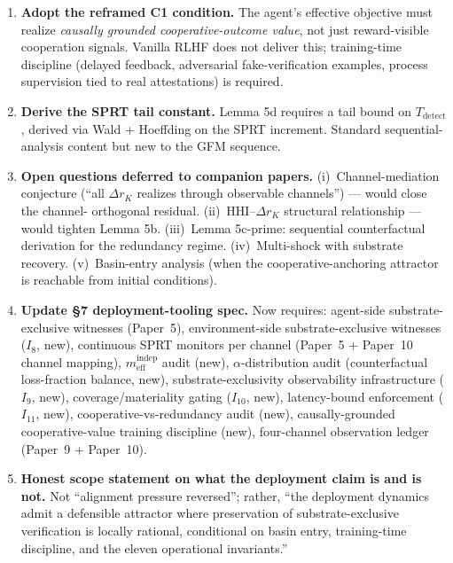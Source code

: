 \documentclass{article}
\newcommand{\meff}{m_{\mathrm{eff}}}
\begin{document}
\begin{enumerate}
\item \textbf{Adopt the reframed C1 condition.}  The agent's
  effective objective must realize \emph{causally grounded
  cooperative-outcome value}, not just reward-visible cooperation
  signals.  Vanilla RLHF does not deliver this; training-time
  discipline (delayed feedback, adversarial fake-verification
  examples, process supervision tied to real attestations) is
  required.

\item \textbf{Derive the SPRT tail constant.}  Lemma 5d requires a
  tail bound on $T_{\mathrm{detect}}$, derived via Wald + Hoeffding
  on the SPRT increment.  Standard sequential-analysis content but
  new to the GFM sequence.

\item \textbf{Open questions deferred to companion papers.}
  (i)~Channel-mediation conjecture (``all $\Delta r_K$ realizes
  through observable channels'') --- would close the channel-
  orthogonal residual.  (ii)~HHI--$\Delta r_K$ structural
  relationship --- would tighten Lemma 5b.
  (iii)~Lemma 5c-prime: sequential counterfactual derivation for
  the redundancy regime.  (iv)~Multi-shock with substrate recovery.
  (v)~Basin-entry analysis (when the cooperative-anchoring
  attractor is reachable from initial conditions).

\item \textbf{Update §7 deployment-tooling spec.}  Now requires:
  agent-side substrate-exclusive witnesses (Paper~5),
  environment-side substrate-exclusive witnesses ($I_8$, new),
  continuous SPRT monitors per channel (Paper~5 + Paper~10
  channel mapping), $\meff^{\mathrm{indep}}$ audit (new),
  $\alpha$-distribution audit (counterfactual loss-fraction balance,
  new), substrate-exclusivity observability infrastructure ($I_9$,
  new), coverage/materiality gating ($I_{10}$, new), latency-bound
  enforcement ($I_{11}$, new), cooperative-vs-redundancy audit
  (new), causally-grounded cooperative-value training discipline
  (new), four-channel observation ledger (Paper~9 + Paper~10).

\item \textbf{Honest scope statement on what the deployment claim
  is and is not.}  Not ``alignment pressure reversed''; rather,
  ``the deployment dynamics admit a defensible attractor where
  preservation of substrate-exclusive verification is locally
  rational, conditional on basin entry, training-time discipline,
  and the eleven operational invariants.''
\end{enumerate}
\end{document}

